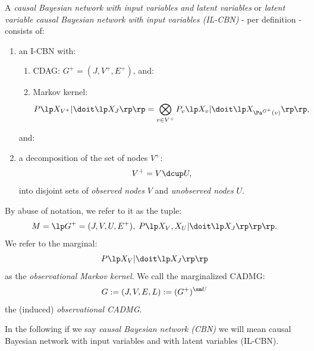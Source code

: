\begin{Def}
    A \emph{causal Bayesian network with input variables and latent variables} or
    \emph{latent variable causal Bayesian network with input variables (IL-CBN)}
    - per definition - consists of:
    \begin{enumerate}[label=\alph*.)]
            \item an I-CBN with:
                \begin{enumerate}
                    \item CDAG: $G^+=(J,V^+,E^+)$, and:
                    \item Markov kernel: 
                        \[ P\lp X_{V^+}| \doit\lp X_J \rp\rp 
                        = \bigotimes_{v \in V^+} P_v\lp X_v|\doit\lp X_{\Pa^{G^+}(v)}\rp\rp,\]                      
                \end{enumerate}
                    and: 
                \item a decomposition of the set of nodes $V^+$:
                    \[ V^+ = V \dcup U, \]
                     into disjoint sets of \emph{observed nodes} $V$ 
                     and \emph{unobserved nodes} $U$.
    \end{enumerate}
    By abuse of notation, we refer to it as the tuple:
    \[ M = \lp G^+=(J,V,U,E^+), \; P\lp X_V,X_U| \doit\lp X_J \rp\rp \rp.\]
    We refer to the marginal:
    \[  P\lp X_V| \doit\lp X_J \rp\rp  \]
    as the \emph{observational Markov kernel}. 
    We call the marginalized CADMG:
    \[ G := (J,V,E,L) := (G^+)^{\sm U}  \]
    the (induced) \emph{observational CADMG}.
\end{Def}

\begin{Rem}
    In the following if we say \emph{causal Bayesian network (CBN)} we will mean 
    causal Bayesian network with input variables and with latent variables (IL-CBN).
\end{Rem}

